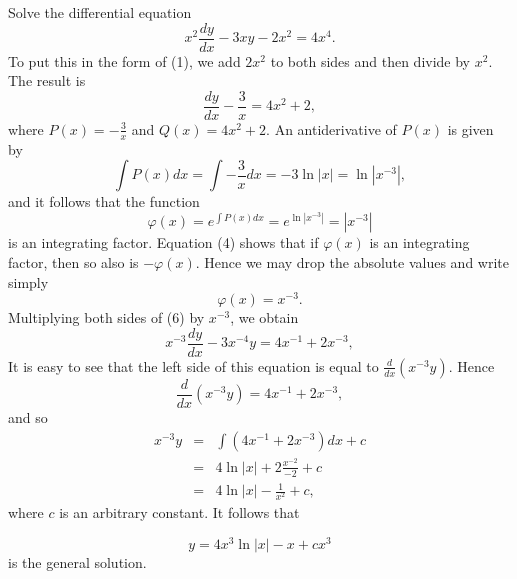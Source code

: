 \begin{example} %
Solve the differential equation 
$$
x^2 \frac{dy}{dx} - 3xy - 2x^2 = 4x^4 .
$$
To put this in the form of (1), we add $2x^2$ to both sides and then divide by $x^2$. The result is
\begin{equation}
\frac{dy}{dx} - \frac{3}{x} = 4x^2 + 2,  
\label{eq11.2.6}
\end{equation}
where $P(x) = -\frac{3}{x}$ and $Q(x) = 4x^2 + 2$. An antiderivative of $P(x)$ is given by  
$$
\int P(x) dx = \int -\frac{3}{x} dx = -3 \ln |x| = \ln |x^{-3}|,
$$
and it follows that the function
$$
\varphi(x) = e^{\int P(x)dx} = e^{\ln |x^{-3}|} = |x^{-3}|
$$
is an integrating factor. Equation (4) shows that if $\varphi(x)$ is an integrating factor, then so also is $-\varphi(x)$. Hence we may drop the absolute values and write simply
$$
\varphi(x) = x^{-3}. 
$$
Multiplying both sides of (6) by $x^{-3}$, we obtain 
$$
x^{-3} \frac{dy}{dx} - 3x^{-4}y = 4x^{-1} + 2x^{-3} ,
$$
It is easy to see that the left side of this equation is equal to $\frac{d}{dx}(x^{-3}y)$. Hence
$$
\frac{d}{dx} (x^{-3} y) = 4x^{-1} + 2x^{-3}, 
$$
and so 
\begin{eqnarray*}
x^{-3}y &=& \int (4x^{-1} + 2x^{-3}) dx + c\\
            &=& 4 \ln |x| + 2 \frac{x^{-2}}{-2} + c \\
            &=& 4 \ln |x| - \frac{1}{x^2} + c,
\end{eqnarray*}
where $c$ is an arbitrary constant. It follows that 

$$
y = 4x^{3} \ln |x| - x + cx^{3}
$$ 
is the general solution.
\end{example}

